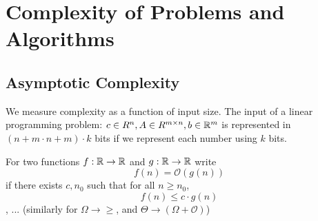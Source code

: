 \chapter{Complexity of Problems and Algorithms}
\label{cha:comp-probl-algor}

\section{Asymptotic Complexity}
\label{sec:asympt-compl}

We measure complexity as a function of input size.  The input of a
linear programming problem: $c \in R^{n}, A \in R^{m \times n}, b \in
\mathbb{R}^{m}$ is represented in $(n + m \cdot n + m) \cdot k$ bits if we
represent each number using $k$ bits.

For two functions $f: \mathbb{R} \rightarrow \mathbb{R}$ and $g: \mathbb{R} \rightarrow \mathbb{R}$
write
\begin{equation}
  \label{eq:27}
  f(n) = \mathcal{O}(g(n))
\end{equation}
if there exists $c, n_{0}$ such that for all $n \geq n_{0}$,
\begin{equation}
  \label{eq:27}
  f(n) \leq c \cdot g(n)
\end{equation}, ... (similarly for $\Omega \rightarrow \geq$, and
$\Theta \rightarrow (\Omega + \mathcal{O})$)

